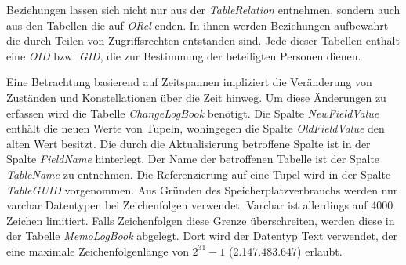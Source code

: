 Beziehungen lassen sich nicht nur aus der \textit{TableRelation} entnehmen, sondern auch aus den Tabellen die auf \textit{ORel} enden. In ihnen werden  Beziehungen aufbewahrt die durch Teilen von Zugriffsrechten entstanden sind. Jede dieser Tabellen enthält eine \textit{OID} bzw. \textit{GID}, die zur Bestimmung der beteiligten Personen dienen.

Eine Betrachtung basierend auf Zeitspannen impliziert die Veränderung von Zuständen und Konstellationen über die Zeit hinweg. Um diese Änderungen zu erfassen wird die Tabelle \textit{ChangeLogBook} benötigt. Die Spalte \textit{NewFieldValue} enthält die neuen Werte von Tupeln, wohingegen die Spalte \textit{OldFieldValue} den alten Wert besitzt. Die durch die Aktualisierung betroffene Spalte ist in der Spalte \textit{FieldName} hinterlegt. Der Name der betroffenen Tabelle ist der Spalte \textit{TableName} zu entnehmen. Die Referenzierung auf eine Tupel wird in der Spalte \textit{TableGUID} vorgenommen. Aus Gründen des Speicherplatzverbrauchs werden nur varchar Datentypen bei Zeichenfolgen verwendet. Varchar ist allerdings auf 4000 Zeichen limitiert. Falls Zeichenfolgen diese Grenze überschreiten, werden diese in der Tabelle \textit{MemoLogBook} abgelegt. Dort wird der Datentyp Text verwendet, der eine maximale Zeichenfolgenlänge von $2^{31}-1$ (2.147.483.647) erlaubt.